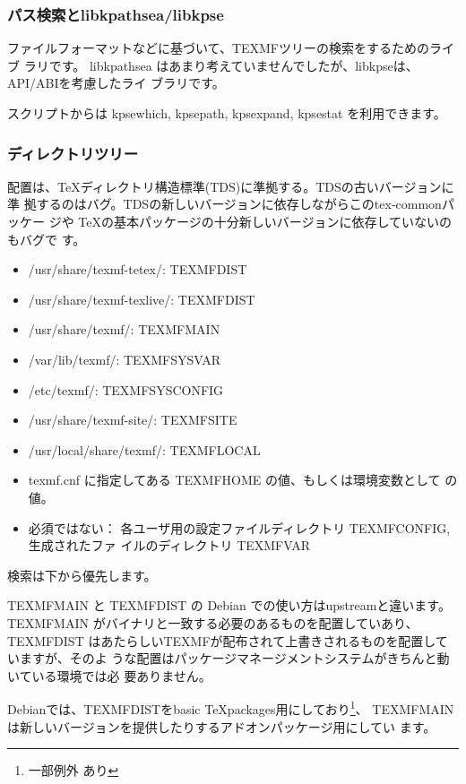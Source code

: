 \documentclass[mingoth,a4paper]{jsarticle}
\begin{document}
\subsubsection{パス検索とlibkpathsea/libkpse}

ファイルフォーマットなどに基づいて、TEXMFツリーの検索をするためのライブ
ラリです。
libkpathsea はあまり考えていませんでしたが、libkpseは、API/ABIを考慮したライ
ブラリです。

スクリプトからは kpsewhich, kpsepath, kpsexpand, kpsestat を利用できます。

\subsubsection{ディレクトリツリー}

配置は、\TeX ディレクトリ構造標準(TDS)に準拠する。TDSの古いバージョンに準
拠するのはバグ。TDSの新しいバージョンに依存しながらこのtex-commonパッケー
ジや \TeX の基本パッケージの十分新しいバージョンに依存していないのもバグで
す。


\begin{itemize}
 \item /usr/share/texmf-tetex/:  TEXMFDIST
 \item /usr/share/texmf-texlive/: TEXMFDIST
 \item /usr/share/texmf/: TEXMFMAIN
 \item /var/lib/texmf/: TEXMFSYSVAR
 \item /etc/texmf/:  TEXMFSYSCONFIG
 \item /usr/share/texmf-site/: TEXMFSITE
 \item /usr/local/share/texmf/:  TEXMFLOCAL
 \item texmf.cnf に指定してある  TEXMFHOME の値、もしくは環境変数として
       の値。
 \item 必須ではない： 各ユーザ用の設定ファイルディレクトリ TEXMFCONFIG, 生成されたファ
       イルのディレクトリ TEXMFVAR
\end{itemize}

検索は下から優先します。

TEXMFMAIN と TEXMFDIST の Debian での使い方はupstreamと違います。
TEXMFMAIN がバイナリと一致する必要のあるものを配置していあり、 TEXMFDIST 
はあたらしいTEXMFが配布されて上書きされるものを配置していますが、そのよ
うな配置はパッケージマネージメントシステムがきちんと動いている環境では必
要ありません。

Debianでは、TEXMFDISTをbasic \TeX packages用にしており\footnote{一部例外
あり}、
TEXMFMAINは新しいバージョンを提供したりするアドオンパッケージ用にしてい
ます。
\end{document}
